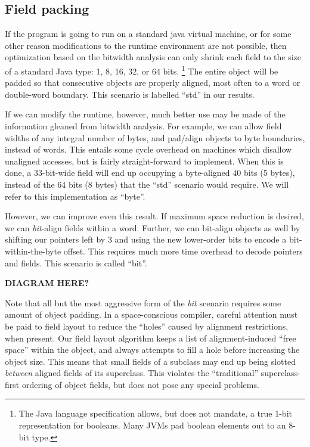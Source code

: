 \documentclass[preprint]{acmconf}
\begin{document}
\subsection{Field packing}
\label{sec:field-packing}
If the program is going to run on a standard java virtual machine, or
for some other reason modifications to the runtime environment are not
possible, then optimization based on the bitwidth analysis can only
shrink each field to the size of a standard Java type: 1,
8, 16, 32, or 64 bits.%
\footnote{The Java language specification allows, but does not mandate,
  a true 1-bit representation for booleans.  Many JVMs pad boolean
  elements out to an 8-bit type.}
The entire object will be padded so that
consecutive objects are properly aligned, most often to a word or
double-word boundary.  This scenario is labelled ``std'' in our results.

If we can modify the runtime, however, much better use may be made of
the information gleaned from bitwidth analysis.  For example, we can
allow field widths of any integral number of bytes, and pad/align
objects to byte boundaries, instead of words.  This entails some
cycle overhead on machines which disallow unaligned accesses, but is
fairly straight-forward to implement.  When this is done,
a 33-bit-wide field will
end up occupying a byte-aligned 40 bits (5 bytes), instead of the 64
bits (8 bytes) that the ``std'' scenario would require.  We will refer
to this implementation as ``byte''.

However, we can improve even this result.  If maximum space reduction
is desired, we can {\it bit}-align fields within a word.  Further, we
can bit-align objects as well by shifting our pointers left by 3 and
using the new lower-order bits to encode a bit-within-the-byte offset.
This requires much more time overhead to decode pointers and fields.
This scenario is called ``bit''.

{\bf DIAGRAM HERE?}

Note that all but the most aggressive form of the {\it bit} scenario
requires some amount of object padding.  In a space-conscious
compiler, careful attention must be paid to field layout to reduce
the ``holes'' caused by alignment restrictions, when present.  Our
field layout algorithm keeps a list of alignment-induced ``free
space'' within the object, and always attempts to fill a hole before
increasing the object size.  This means that small fields of a
subclass may end up being slotted {\it between} aligned fields of its
superclass.  This violates the ``traditional'' superclass-first
ordering of object fields, but does not pose any special problems.
\end{document}
